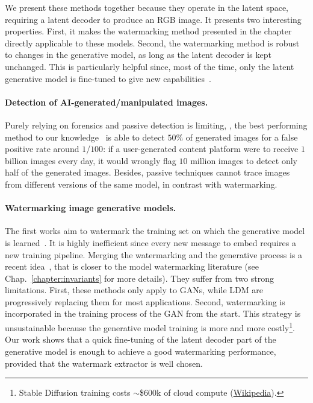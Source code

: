 We present these methods together because they operate in the latent space, requiring a latent decoder to produce an RGB image. 
It presents two interesting properties.
First, it makes the watermarking method presented in the chapter directly applicable to these models.
Second, the watermarking method is robust to changes in the generative model, as long as the latent decoder is kept unchanged. 
This is particularly helpful since, most of the time, only the latent generative model is fine-tuned to give new capabilities~\citep{zhang2023adding, brooks2022instructpix2pix}.
 
\paragraph{Detection of AI-generated/manipulated images.}
Purely relying on forensics and passive detection is limiting, \eg, the best performing method to our knowledge~\citep{corvi2022detection} is able to detect $50\%$ of generated images for a false positive rate around $1$/$100$:
if a user-generated content platform were to receive $1$ billion images every day, it would wrongly flag $10$ million images to detect only half of the generated images.
Besides, passive techniques cannot trace images from different versions of the same model, in contrast with watermarking.

\paragraph{Watermarking image generative models.}
The first works aim to watermark the training set on which the generative model is learned~\citep{yu2021artificial}.
It is highly inefficient since every new message to embed requires a new training pipeline.
Merging the watermarking and the generative process is a recent idea~\citep{fei2022supervised, lin2022cycleganwm, nie2023attributing, qiao2023novel, wu2020watermarking, yu2022responsible, zhang2020model}, that is closer to the model watermarking literature (see Chap.~\ref{chapter:invariants} for more details).
They suffer from two strong limitations.
First, these methods only apply to GANs, while LDM are progressively replacing them for most applications. 
Second, watermarking is incorporated in the training process of the GAN from the start. 
This strategy is unsustainable because the generative model training is more and more costly\footnote{Stable Diffusion training costs $\sim$\$600k of cloud compute (\href{https://en.wikipedia.org/wiki/Stable_Diffusion}{Wikipedia}).}.
Our work shows that a quick fine-tuning of the latent decoder part of the generative model is enough to achieve a good watermarking performance, provided that the watermark extractor is well chosen.


